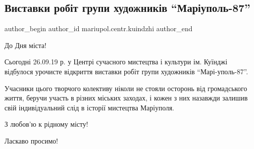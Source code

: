  
 
 
 
 

\subsection{Виставки робіт групи художників \enquote{Маріуполь-87}}
\label{sec:26_09_2019.fb.mariupol.centr.kuindzhi.1.vystavka_87}

\ifcmt
 author_begin
   author_id mariupol.centr.kuindzhi
 author_end
\fi

До Дня міста!

Сьогодні 26.09.19 р. у Центрі сучасного мистецтва і культури ім. Куїнджі
відбулося урочисте відкриття виставки робіт групи художників \enquote{Марі\hyp{}уполь-87}.

Учасники цього творчого колективу ніколи не стояли осторонь від громадського
життя, беручи участь в різних міських заходах, і кожен з них назавжди залишив
свій індивідуальний слід в історії мистецтва Маріуполя.

З любов'ю к рідному місту!

Ласкаво просимо!

